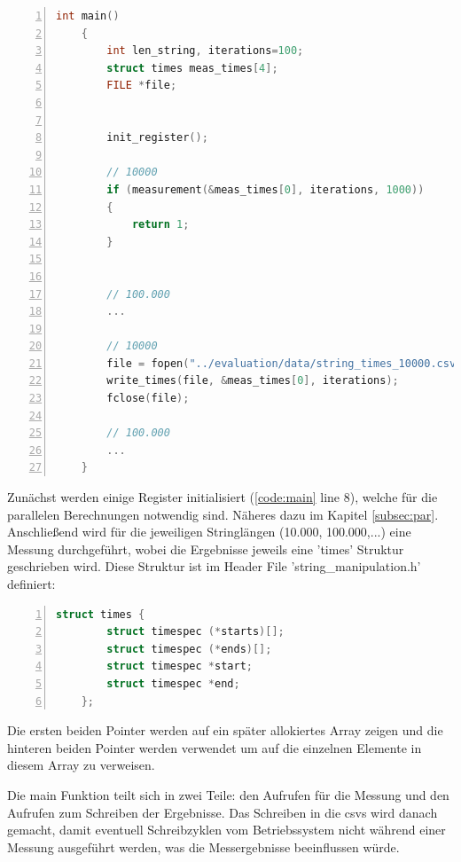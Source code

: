 \documentclass[plainarticle,zihtitle,german,final,hyperref,utf8]{zihpub}
\begin{document}
\begin{lstlisting}[language=c, numbers=left]
	int main()
	{
		int len_string, iterations=100;
		struct times meas_times[4];
		FILE *file;


		init_register();

		// 10000
		if (measurement(&meas_times[0], iterations, 1000))
		{
			return 1;
		}

		
		// 100.000
		...
	
		// 10000
		file = fopen("../evaluation/data/string_times_10000.csv", "w");
		write_times(file, &meas_times[0], iterations);
		fclose(file);
		
		// 100.000
		...
	}
\end{lstlisting}
\label{code:main}

Zunächst werden einige Register initialisiert (\ref{code:main} line 8), welche für die parallelen Berechnungen notwendig sind. Näheres dazu im Kapitel \ref{subsec:par}. Anschließend wird für die jeweiligen Stringlängen (10.000, 100.000,...) eine Messung durchgeführt, wobei die Ergebnisse jeweils eine 'times' Struktur geschrieben wird.\newline
Diese Struktur ist im Header File 'string\_manipulation.h' definiert:
\begin{lstlisting}[language=c, numbers=left]
	struct times {
		struct timespec (*starts)[];
		struct timespec (*ends)[];
		struct timespec *start;
		struct timespec *end;
	};
\end{lstlisting}\label{code:times}
Die ersten beiden Pointer werden auf ein später allokiertes Array zeigen und die hinteren beiden Pointer werden verwendet um auf die einzelnen Elemente in diesem Array zu verweisen.

Die main Funktion teilt sich in zwei Teile: den Aufrufen für die Messung und den Aufrufen zum Schreiben der Ergebnisse. Das Schreiben in die csvs wird danach gemacht, damit eventuell Schreibzyklen vom Betriebssystem nicht während einer Messung ausgeführt werden, was die Messergebnisse beeinflussen würde.
\end{document}
